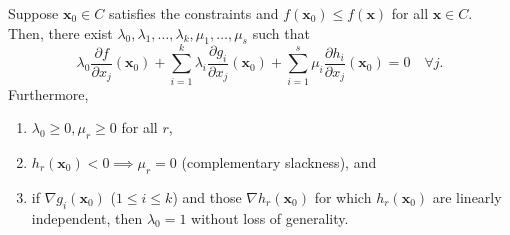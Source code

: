 \begin{thm}
    Suppose $\mathbf{x}_0 \in C$ satisfies the constraints and $f(\mathbf{x}_0) \leq f(\mathbf{x})$ for all $\mathbf{x} \in C$. Then, there exist $\lambda_0, \lambda_1, \ldots, \lambda_k, \mu_1, \ldots, \mu_s$ such that
    \[
        \lambda_0 \frac{\partial f}{\partial x_j}(\mathbf{x}_0) + \sum_{i=1}^k \lambda_i \frac{\partial g_i}{\partial x_j}(\mathbf{x}_0) + \sum_{i=1}^s \mu_i \frac{\partial h_i}{\partial x_j}(\mathbf{x}_0) = 0 \quad \forall j. 
    \]
    Furthermore, 
    \begin{enumerate}
        \item $\lambda_0 \geq 0, \mu_r \geq 0$ for all $r$,
        \item $h_r(\mathbf{x}_0) < 0 \implies \mu_r = 0$ (complementary slackness), and
        \item if $\nabla g_i(\mathbf{x}_0)$ ($1 \leq i \leq k$) and those $\nabla h_r(\mathbf{x}_0)$ for which $h_r(\mathbf{x}_0)$ are linearly independent, then $\lambda_0 = 1$ without loss of generality.
    \end{enumerate}
\end{thm}

